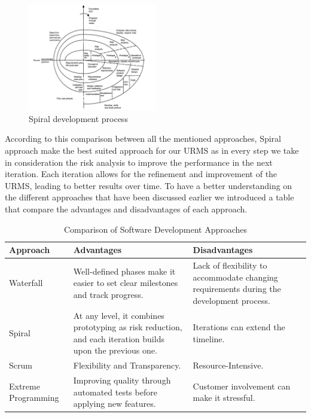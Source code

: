 \documentclass[conference,onecolumn]{IEEEtran}
\begin{document}
	\begin{figure}[H]
		\centering
		\includegraphics[width=0.5\textwidth]{Figures/Spiral.png}
		\caption{Spiral development process}
		\label{fig:spiral}
	\end{figure}

	According to this comparison between all the mentioned approaches, Spiral approach make the best suited approach for our URMS as in every step we take in consideration the risk analysis to improve the performance in the next iteration. Each iteration allows for the refinement and improvement of the URMS, leading to better results over time. To have a better understanding on the different approaches that have been discussed earlier we introduced a table that compare the advantages and disadvantages of each approach.

	\begin{table}[h]
		\centering
		\begin{tabular}{|m{2.5cm}|m{5cm}|m{5cm}|}
			\hline
			\textbf{Approach} & \textbf{Advantages} & \textbf{Disadvantages} \\
			\hline
			Waterfall & Well-defined phases make it easier to set clear milestones and track progress. & Lack of flexibility to accommodate changing requirements during the development process. \\
			\hline
			Spiral & At any level, it combines prototyping as risk reduction, and each iteration builds upon the previous one. & Iterations can extend the timeline. \\
			\hline
			Scrum & Flexibility and Transparency. & Resource-Intensive. \\
			\hline
			Extreme Programming & Improving quality through automated tests before applying new features. & Customer involvement can make it stressful. \\
			\hline
		\end{tabular}
		\caption{Comparison of Software Development Approaches}
		\label{tab:sdapproaches}
	\end{table}
\end{document}
